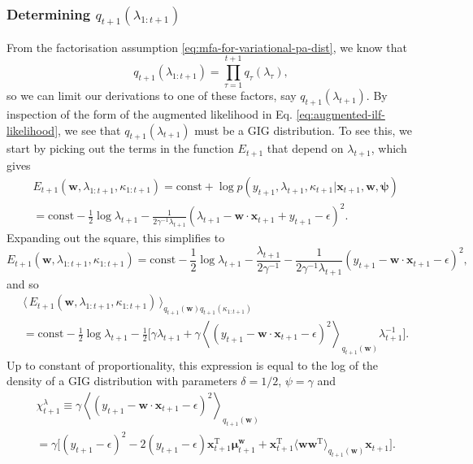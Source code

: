 \subsubsection{Determining $q_{t+1}(\lambda_{1:t+1})$}

From the factorisation assumption \eqref{eq:mfa-for-variational-pa-dist}, we know that
\begin{equation}
	q_{t+1}(\lambda_{1:t+1})
	= \prod_{\tau=1}^{t+1} q_{\tau}(\lambda_\tau),
\end{equation}
so we can limit our derivations to one of these factors, say $q_{t+1}(\lambda_{t+1})$.
By inspection of the form of the augmented likelihood in Eq. \eqref{eq:augmented-ilf-likelihood}, we see that $q_{t+1}(\lambda_{t+1})$ must be a GIG distribution. To see this, we start by picking out the terms in the function $E_{t+1}$ that depend on $\lambda_{t+1}$, which gives
\begin{align}
	& E_{t+1}(\mathbf{w}, \lambda_{1:t+1}, \kappa_{1:t+1})
	= \text{const} + \log p(y_{t+1}, \lambda_{t+1}, \kappa_{t+1}|\mathbf{x}_{t+1}, \mathbf{w}, \boldsymbol{\psi})
	\nonumber \\	
	&= \text{const} - \frac{1}{2}\log\lambda_{t+1} - \frac{1}{2\gamma^{-1}\lambda_{t+1}}(\lambda_{t+1} - \mathbf{w}\cdot\mathbf{x}_{t+1} + y_{t+1} - \epsilon)^2.
\end{align}
Expanding out the square, this simplifies to
\begin{equation}
	E_{t+1}(\mathbf{w}, \lambda_{1:t+1}, \kappa_{1:t+1})
	= \text{const} - \frac{1}{2}\log\lambda_{t+1} - \frac{\lambda_{t+1}}{2\gamma^{-1}} - \frac{1}{2\gamma^{-1}\lambda_{t+1}}(y_{t+1} -\mathbf{w}\cdot\mathbf{x}_{t+1} - \epsilon)^2,
\end{equation}
and so
\begin{align}
	& \langle\, E_{t+1}(\mathbf{w}, \lambda_{1:t+1}, \kappa_{1:t+1})\,\rangle_{q_{t+1}(\mathbf{w})q_{t+1}(\kappa_{1:t+1})}
	\nonumber \\
	&= \text{const} - \frac{1}{2}\log\lambda_{t+1} - \frac{1}{2}\Big[\gamma\lambda_{t+1} + \gamma\left\langle(y_{t+1} -\mathbf{w}\cdot\mathbf{x}_{t+1} - \epsilon)^2\right\rangle_{q_{t+1}(\mathbf{w})}\lambda_{t+1}^{-1}\Big].
\end{align}
Up to constant of proportionality, this expression is equal to the log of the density of a GIG distribution with parameters $\delta = 1/2$, $\psi = \gamma$ and
\begin{align}
	& \chi_{t+1}^\lambda
	\equiv \gamma\left\langle(y_{t+1} -\mathbf{w}\cdot\mathbf{x}_{t+1} - \epsilon)^2\right\rangle_{q_{t+1}(\mathbf{w})}
	\nonumber \\
	&= \gamma\big[(y_{t+1} - \epsilon)^2 - 2(y_{t+1} - \epsilon)\mathbf{x}_{t+1}^\text{T}\boldsymbol{\mu}_{t+1}^\mathbf{w} + \mathbf{x}_{t+1}^\text{T}\langle\mathbf{w}\mathbf{w}^\text{T}\rangle_{q_{t+1}(\mathbf{w})}\mathbf{x}_{t+1}\big].
\end{align}
